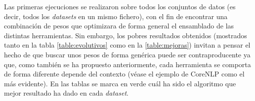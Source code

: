 Las primeras ejecuciones se realizaron sobre todos los conjuntos de datos (es decir, todos los \textit{datasets} en un mismo fichero), con el fin de encontrar una combinación de pesos que optimizara de forma general el ensamblado de las distintas herramientas. Sin embargo, los pobres resultados obtenidos (mostrados tanto en la tabla \ref{table:evolutivos} como en la \ref{table:mejoras}) invitan a pensar el hecho de que buscar unos pesos de forma genérica puede ser contraproducente ya que, como también se ha propuesto anteriormente, cada herramienta se comporta de forma diferente depende del contexto (véase el ejemplo de CoreNLP como el más evidente). En las tablas se marca en verde cuál ha sido el algoritmo que mejor resultado ha dado en cada \textit{dataset}.
\newpage
\begin{table} [H]
\end{table}
